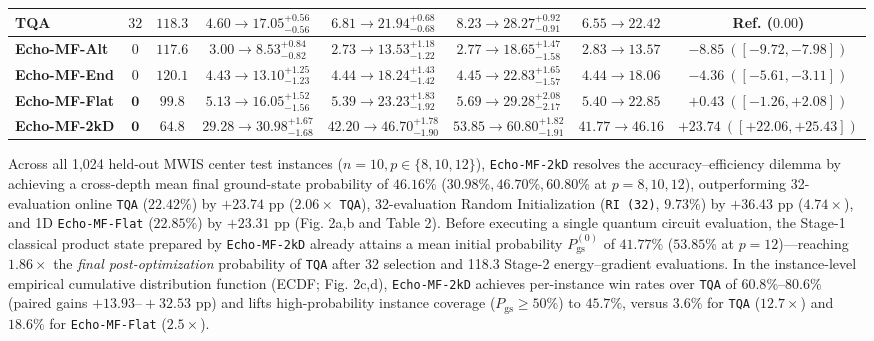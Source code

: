 \documentclass[10pt,a4paper]{article}
\begin{document}
\begin{table}[!htbp]
{\begin{tabular}{@{}lccccccc@{}}
\textbf{TQA} & $32$ & $118.3$ & $4.60 \rightarrow 17.05^{+0.56}_{-0.56}$ & $6.81 \rightarrow 21.94^{+0.68}_{-0.68}$ & $8.23 \rightarrow 28.27^{+0.92}_{-0.91}$ & $6.55 \rightarrow 22.42$ & Ref. ($0.00$) \\
\midrule
\textbf{Echo-MF-Alt} & $0$ & $117.6$ & $3.00 \rightarrow 8.53^{+0.84}_{-0.82}$ & $2.73 \rightarrow 13.53^{+1.18}_{-1.22}$ & $2.77 \rightarrow 18.65^{+1.47}_{-1.58}$ & $2.83 \rightarrow 13.57$ & $-8.85\ ([-9.72, -7.98])$ \\
\textbf{Echo-MF-End} & $0$ & $120.1$ & $4.43 \rightarrow 13.10^{+1.25}_{-1.23}$ & $4.44 \rightarrow 18.24^{+1.43}_{-1.42}$ & $4.45 \rightarrow 22.83^{+1.65}_{-1.57}$ & $4.44 \rightarrow 18.06$ & $-4.36\ ([-5.61, -3.11])$ \\
\textbf{Echo-MF-Flat} & $\mathbf{0}$ & $99.8$ & $5.13 \rightarrow 16.05^{+1.52}_{-1.56}$ & $5.39 \rightarrow 23.23^{+1.83}_{-1.92}$ & $5.69 \rightarrow 29.28^{+2.08}_{-2.17}$ & $5.40 \rightarrow 22.85$ & $+0.43\ ([-1.26, +2.08])$ \\
\midrule
\textbf{Echo-MF-2kD} & $\mathbf{0}$ & $\mathbf{64.8}$ & $\mathbf{29.28} \rightarrow \mathbf{30.98}^{+1.67}_{-1.68}$ & $\mathbf{42.20} \rightarrow \mathbf{46.70}^{+1.78}_{-1.90}$ & $\mathbf{53.85} \rightarrow \mathbf{60.80}^{+1.82}_{-1.91}$ & $\mathbf{41.77} \rightarrow \mathbf{46.16}$ & $\mathbf{+23.74}\ ([+22.06, +25.43])$ \\
\bottomrule
\end{tabular}%
}
\end{table}
Across all 1,024 held-out MWIS center test instances ($n=10, p \in \{8, 10, 12\}$), \texttt{Echo-MF-2kD} resolves the accuracy--efficiency dilemma by achieving a cross-depth mean final ground-state probability of $\mathbf{46.16}\%$ ($\mathbf{30.98}\%, \mathbf{46.70}\%, \mathbf{60.80}\%$ at $p=8, 10, 12$), outperforming 32-evaluation online \texttt{TQA} ($22.42\%$) by $\mathbf{+23.74}$ pp ($2.06\times$ \texttt{TQA}), 32-evaluation Random Initialization (\texttt{RI (32)}, $9.73\%$) by $+36.43$ pp ($4.74\times$), and 1D \texttt{Echo-MF-Flat} ($22.85\%$) by $+23.31$ pp (Fig. 2a,b and Table 2). Before executing a single quantum circuit evaluation, the Stage-1 classical product state prepared by \texttt{Echo-MF-2kD} already attains a mean initial probability $P_{\mathrm{gs}}^{(0)}$ of $\mathbf{41.77}\%$ ($\mathbf{53.85}\%$ at $p=12$)---reaching $1.86\times$ the \emph{final post-optimization} probability of \texttt{TQA} after 32 selection and 118.3 Stage-2 energy--gradient evaluations. In the instance-level empirical cumulative distribution function (ECDF; Fig. 2c,d), \texttt{Echo-MF-2kD} achieves per-instance win rates over \texttt{TQA} of $60.8\%\mbox{--}80.6\%$ (paired gains $+13.93\mbox{--}{+}32.53$ pp) and lifts high-probability instance coverage ($P_{\mathrm{gs}} \ge 50\%$) to $\mathbf{45.7}\%$, versus $3.6\%$ for \texttt{TQA} ($12.7\times$) and $18.6\%$ for \texttt{Echo-MF-Flat} ($2.5\times$).
\end{document}
